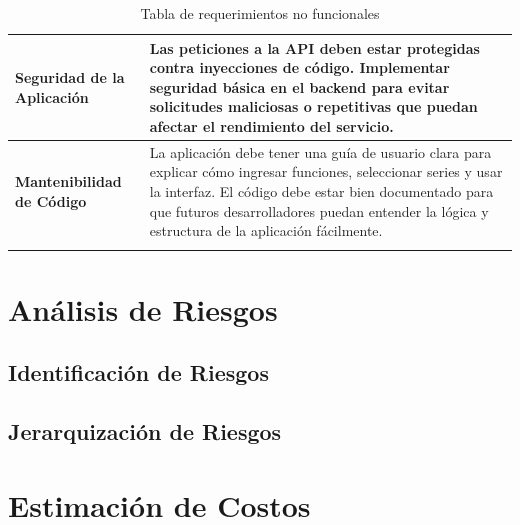 \begin{longtable}{|m{5cm}|m{10cm}|}
	\hline
	\textbf{Seguridad de la Aplicación} & Las peticiones a la API deben estar protegidas contra inyecciones de código. Implementar seguridad básica en el backend para evitar solicitudes maliciosas o repetitivas que puedan afectar el rendimiento del servicio. \\
	\hline
	\textbf{Mantenibilidad de Código} & La aplicación debe tener una guía de usuario clara para explicar cómo ingresar funciones, seleccionar series y usar la interfaz. El código debe estar bien documentado para que futuros desarrolladores puedan entender la lógica y estructura de la aplicación fácilmente. \\
	\hline
	\rowcolor{white} \caption{Tabla de requerimientos no funcionales} \label{tabla:RNF} \\
\end{longtable}




\section{Análisis de Riesgos}
\subsection{Identificación de Riesgos}
\subsection{Jerarquización de Riesgos}

\section{Estimación de Costos}
